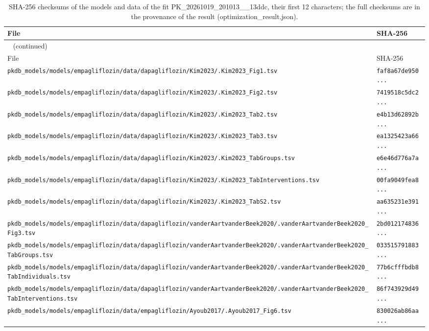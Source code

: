 \begin{longtable}{ll}
\caption{SHA-256 checksums of the models and data of the fit PK\_20261019\_201013\_\_13ddc, their first 12 characters; the full checksums are in the provenance of the result (optimization\_result.json).}\label{tab:checksums:PK_20261019_201013__13ddc} \\
\toprule
File & SHA-256 \\
\midrule
\endfirsthead
\multicolumn{2}{l}{\small\tablename~\thetable{} (continued)} \\
\toprule
File & SHA-256 \\
\midrule
\endhead
\bottomrule
\endlastfoot
\texttt{pkdb\_models/models/empagliflozin/data/dapagliflozin/Kim2023/.Kim2023\_Fig1.tsv} & \texttt{faf8a67de950...} \\
\texttt{pkdb\_models/models/empagliflozin/data/dapagliflozin/Kim2023/.Kim2023\_Fig2.tsv} & \texttt{7419518c5dc2...} \\
\texttt{pkdb\_models/models/empagliflozin/data/dapagliflozin/Kim2023/.Kim2023\_Tab2.tsv} & \texttt{e4b13d62892b...} \\
\texttt{pkdb\_models/models/empagliflozin/data/dapagliflozin/Kim2023/.Kim2023\_Tab3.tsv} & \texttt{ea1325423a66...} \\
\texttt{pkdb\_models/models/empagliflozin/data/dapagliflozin/Kim2023/.Kim2023\_TabGroups.tsv} & \texttt{e6e46d776a7a...} \\
\texttt{pkdb\_models/models/empagliflozin/data/dapagliflozin/Kim2023/.Kim2023\_TabInterventions.tsv} & \texttt{00fa9049fea8...} \\
\texttt{pkdb\_models/models/empagliflozin/data/dapagliflozin/Kim2023/.Kim2023\_TabS2.tsv} & \texttt{aa635231e391...} \\
\texttt{pkdb\_models/models/empagliflozin/data/dapagliflozin/vanderAartvanderBeek2020/.vanderAartvanderBeek2020\_Fig3.tsv} & \texttt{2bd012174836...} \\
\texttt{pkdb\_models/models/empagliflozin/data/dapagliflozin/vanderAartvanderBeek2020/.vanderAartvanderBeek2020\_TabGroups.tsv} & \texttt{033515791883...} \\
\texttt{pkdb\_models/models/empagliflozin/data/dapagliflozin/vanderAartvanderBeek2020/.vanderAartvanderBeek2020\_TabIndividuals.tsv} & \texttt{77b6cfffbdb8...} \\
\texttt{pkdb\_models/models/empagliflozin/data/dapagliflozin/vanderAartvanderBeek2020/.vanderAartvanderBeek2020\_TabInterventions.tsv} & \texttt{86f743929d49...} \\
\texttt{pkdb\_models/models/empagliflozin/data/empagliflozin/Ayoub2017/.Ayoub2017\_Fig6.tsv} & \texttt{830026ab86aa...} \\

\end{longtable}
